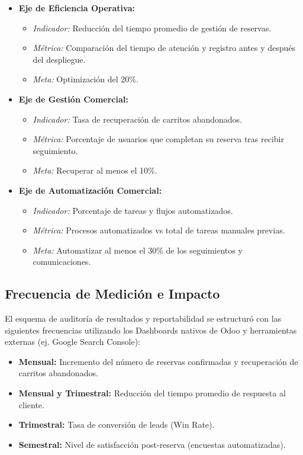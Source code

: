 \begin{itemize}
    \item \textbf{Eje de Eficiencia Operativa:}
    \begin{itemize}
        \item \textit{Indicador:} Reducción del tiempo promedio de gestión de reservas.
        \item \textit{Métrica:} Comparación del tiempo de atención y registro antes y después del despliegue.
        \item \textit{Meta:} Optimización del 20\%.
    \end{itemize}
    \item \textbf{Eje de Gestión Comercial:}
    \begin{itemize}
        \item \textit{Indicador:} Tasa de recuperación de carritos abandonados.
        \item \textit{Métrica:} Porcentaje de usuarios que completan su reserva tras recibir seguimiento.
        \item \textit{Meta:} Recuperar al menos el 10\%.
    \end{itemize}
    \item \textbf{Eje de Automatización Comercial:}
    \begin{itemize}
        \item \textit{Indicador:} Porcentaje de tareas y flujos automatizados.
        \item \textit{Métrica:} Procesos automatizados vs total de tareas manuales previas.
        \item \textit{Meta:} Automatizar al menos el 30\% de los seguimientos y comunicaciones.
    \end{itemize}
\end{itemize}

\subsection{Frecuencia de Medición e Impacto}
El esquema de auditoría de resultados y reportabilidad se estructuró con las siguientes frecuencias utilizando los Dashboards nativos de Odoo y herramientas externas (ej. Google Search Console):

\begin{itemize}
    \item \textbf{Mensual:} Incremento del número de reservas confirmadas y recuperación de carritos abandonados.
    \item \textbf{Mensual y Trimestral:} Reducción del tiempo promedio de respuesta al cliente.
    \item \textbf{Trimestral:} Tasa de conversión de leads (Win Rate).
    \item \textbf{Semestral:} Nivel de satisfacción post-reserva (encuestas automatizadas).
\end{itemize}
